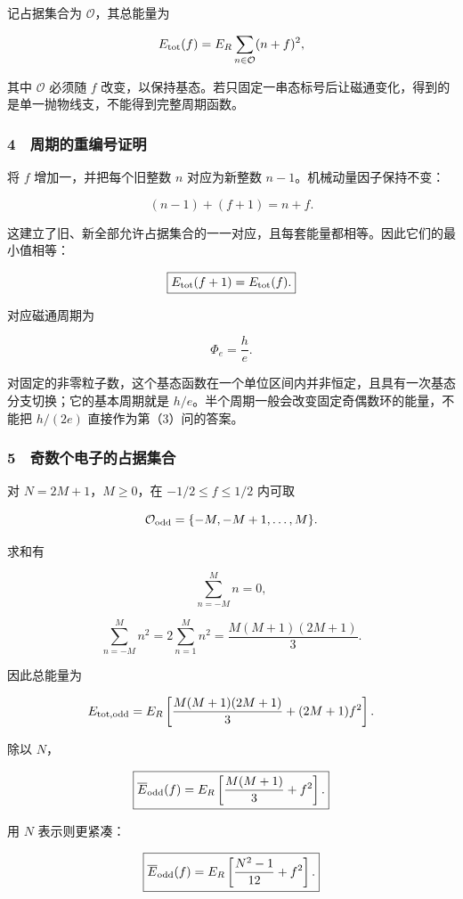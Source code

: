 \documentclass[12pt,a4paper,fontset=fandol]{ctexart}
\begin{document}
记占据集合为 \(\mathcal O\)，其总能量为

\[E_{\rm tot}(f)=E_R\sum_{n\in\mathcal O}(n+f)^2,\]

其中 \(\mathcal O\) 必须随 \(f\)
改变，以保持基态。若只固定一串态标号后让磁通变化，得到的是单一抛物线支，不能得到完整周期函数。

\subsubsection{4　周期的重编号证明}\label{ux5468ux671fux7684ux91cdux7f16ux53f7ux8bc1ux660e}

将 \(f\) 增加一，并把每个旧整数 \(n\) 对应为新整数
\(n-1\)。机械动量因子保持不变：

\[ (n-1)+(f+1)=n+f.\]

这建立了旧、新全部允许占据集合的一一对应，且每套能量都相等。因此它们的最小值相等：

\[\boxed{E_{\rm tot}(f+1)=E_{\rm tot}(f).}\]

对应磁通周期为

\[\boxed{\Phi_e=\frac he.}\]

对固定的非零粒子数，这个基态函数在一个单位区间内并非恒定，且具有一次基态分支切换；它的基本周期就是
\(h/e\)。半个周期一般会改变固定奇偶数环的能量，不能把 \(h/(2e)\)
直接作为第（3）问的答案。

\subsubsection{5　奇数个电子的占据集合}\label{ux5947ux6570ux4e2aux7535ux5b50ux7684ux5360ux636eux96c6ux5408}

对 \(N=2M+1\)，\(M\ge0\)，在 \(-1/2\le f\le1/2\) 内可取

\[\mathcal O_{\rm odd}=\{-M,-M+1,\ldots,M\}.\]

求和有

\[\sum_{n=-M}^Mn=0,\]

\[\sum_{n=-M}^Mn^2=2\sum_{n=1}^Mn^2
=\frac{M(M+1)(2M+1)}3.\]

因此总能量为

\[E_{\rm tot,odd}
=E_R\left[\frac{M(M+1)(2M+1)}3+(2M+1)f^2\right].\]

除以 \(N\)，

\[\boxed{\overline E_{\rm odd}(f)
=E_R\left[\frac{M(M+1)}3+f^2\right].}\]

用 \(N\) 表示则更紧凑：

\[\boxed{\overline E_{\rm odd}(f)
=E_R\left[\frac{N^2-1}{12}+f^2\right].}\]
\end{document}
